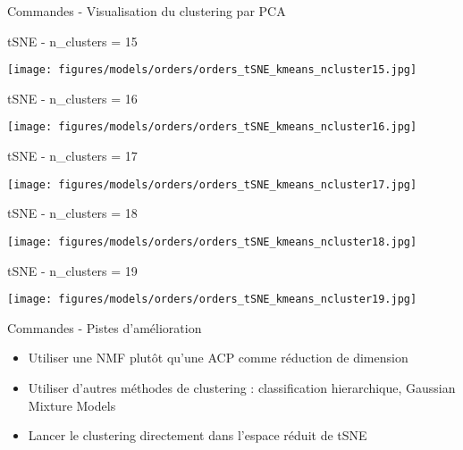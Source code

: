 \documentclass[10pt]{beamer}
\begin{document}
\begin{frame}{Commandes - Visualisation du clustering par PCA}
    \begin{overprint}
        tSNE -  n\_clusters = 15
            \begin{center}             
                \texttt{[image: figures/models/orders/orders\_tSNE\_kmeans\_ncluster15.jpg]}
            \end{center}
        tSNE -  n\_clusters = 16
            \begin{center}             
                \texttt{[image: figures/models/orders/orders\_tSNE\_kmeans\_ncluster16.jpg]}
            \end{center}
        tSNE -  n\_clusters = 17
            \begin{center}             
                \texttt{[image: figures/models/orders/orders\_tSNE\_kmeans\_ncluster17.jpg]}
            \end{center}
        tSNE -  n\_clusters = 18
            \begin{center}             
                \texttt{[image: figures/models/orders/orders\_tSNE\_kmeans\_ncluster18.jpg]}
            \end{center}
        tSNE -  n\_clusters = 19
            \begin{center}             
                \texttt{[image: figures/models/orders/orders\_tSNE\_kmeans\_ncluster19.jpg]}
            \end{center}
    \end{overprint}
\end{frame}

\begin{frame}{Commandes - Pistes d'amélioration}
    \begin{itemize}
        \item Utiliser une NMF plutôt qu'une ACP comme réduction de dimension
        \item Utiliser d'autres méthodes de clustering : classification hierarchique, Gaussian Mixture Models
        \item Lancer le clustering directement dans l'espace réduit de tSNE
    \end{itemize}
\end{frame}
\end{document}
